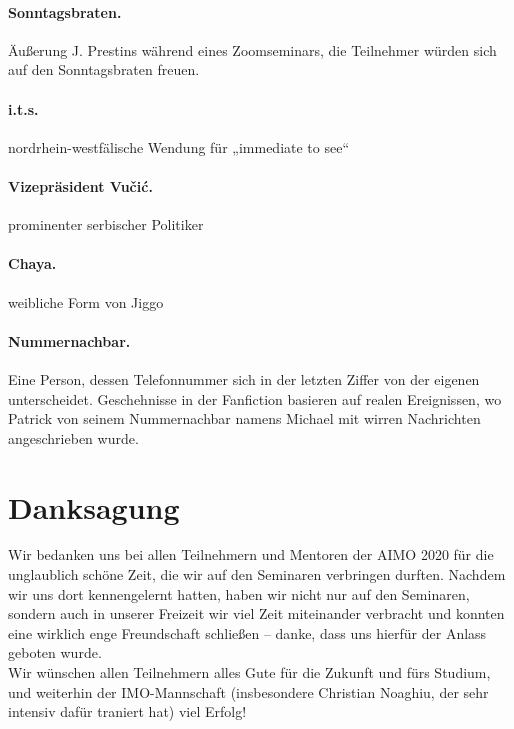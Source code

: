 \documentclass[oneside]{memoir}
\begin{document}
\paragraph{Sonntagsbraten.} Äußerung J. Prestins während eines Zoomseminars, die Teilnehmer würden sich auf den Sonntagsbraten freuen.
\paragraph{i.t.s.} nordrhein-westfälische Wendung für „immediate to see“
\paragraph{Vizepräsident Vučić.} prominenter serbischer Politiker
\paragraph{Chaya.} weibliche Form von Jiggo
\paragraph{Nummernachbar.} Eine Person, dessen Telefonnummer sich in der letzten Ziffer von der eigenen unterscheidet. Geschehnisse in der Fanfiction basieren auf realen Ereignissen, wo Patrick von seinem Nummernachbar namens Michael mit wirren Nachrichten angeschrieben wurde.
\newpage
\section*{Danksagung} 
Wir bedanken uns bei allen Teilnehmern und Mentoren der AIMO 2020 für die unglaublich schöne Zeit, die wir auf den Seminaren verbringen durften. Nachdem wir uns dort kennengelernt hatten, haben wir nicht nur auf den Seminaren, sondern auch in unserer Freizeit wir viel Zeit miteinander verbracht und konnten eine wirklich enge Freundschaft schließen -- danke, dass uns hierfür der Anlass geboten wurde. \\
Wir wünschen allen Teilnehmern alles Gute für die Zukunft und fürs Studium, und weiterhin der IMO-Mannschaft (insbesondere Christian Noaghiu, der sehr intensiv dafür traniert hat) viel Erfolg!
\end{document}
